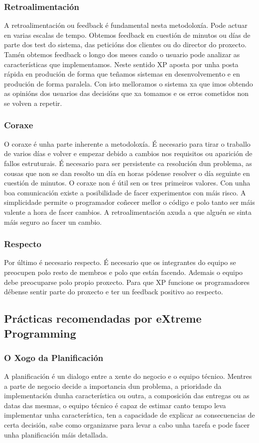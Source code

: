 \subsubsection{Retroalimentación}
A retroalimentación ou feedback é fundamental nesta metodoloxía. Pode actuar en varias escalas de tempo. Obtemos feedback en cuestión de minutos ou días de parte dos test do sistema, das peticións dos clientes ou do director do proxecto. Tamén obtemos feedback o longo dos meses cando o usuario pode analizar as características que implementamos. Neste sentido XP aposta por unha posta rápida en produción de forma que teñamos sistemas en desenvolvemento e en produción de forma paralela. Con isto melloramos o sistema xa que imos obtendo as opinións dos usuarios das decisións que xa tomamos e os erros cometidos non se volven a repetir.

\subsubsection{Coraxe}
O coraxe é unha parte inherente a metodoloxía. É necesario para tirar o traballo de varios días e volver e empezar debido a cambios nos requisitos ou aparición de fallos estruturais. É necesario para ser persistente ca resolución dun problema, as cousas que non se dan resolto un día en horas pódense resolver o día seguinte en cuestión de minutos. O coraxe non é útil sen os tres primeiros valores. Con unha boa comunicación existe a posibilidade de facer experimentos con máis risco. A simplicidade permite o programador coñecer mellor o código e polo tanto ser máis valente a hora de facer cambios. A retroalimentación axuda a que alguén se sinta máis seguro ao facer un cambio.

\subsubsection{Respecto}
Por último é necesario respecto. É necesario que os integrantes do equipo se preocupen polo resto de membros e polo que están facendo. Ademais o equipo debe preocuparse polo propio proxecto. Para que XP funcione os programadores débense sentir parte do proxecto e ter un feedback positivo ao respecto.

\subsection{Prácticas recomendadas por eXtreme Programming}

\subsubsection{O Xogo da Planificación}
A planificación é un dialogo entre a xente do negocio e o equipo técnico. Mentres a parte de negocio decide a importancia dun problema, a prioridade da implementación dunha característica ou outra, a composición das entregas ou as datas das mesmas, o equipo técnico é capaz de estimar canto tempo leva implementar unha característica, ten a capacidade de explicar as consecuencias de certa decisión, sabe como organizarse para levar a cabo unha tarefa e pode facer unha planificación máis detallada.

